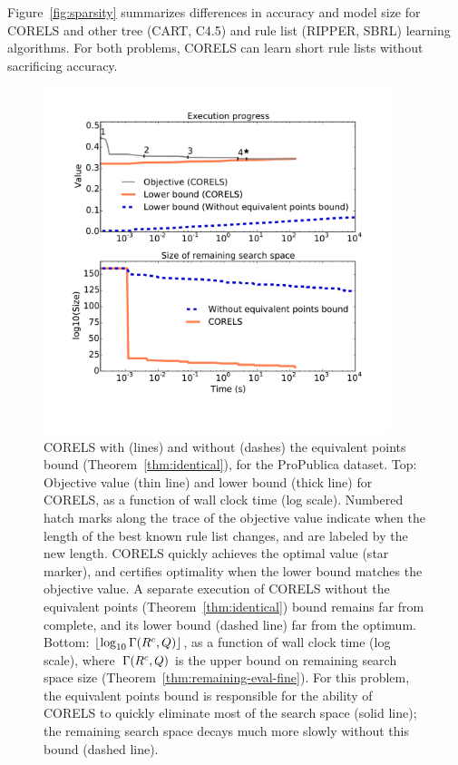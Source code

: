 Figure~\ref{fig:sparsity} summarizes differences in accuracy and model size
for CORELS and other tree (CART, C4.5) and rule list (RIPPER, SBRL) learning algorithms.
%
For both problems, CORELS can learn short rule lists without sacrificing accuracy.

\begin{figure}[t!]
\begin{center}
\includegraphics[trim={20mm, 25mm, 24mm, 20mm},
width=0.9\textwidth]{figs/compas_execution_large-remaining-space.pdf}
\end{center}
\caption{CORELS with (lines) and without
(dashes) the equivalent points bound (Theorem~\ref{thm:identical}),
for the ProPublica dataset.
%
Top: Objective value (thin line) and lower bound (thick line) for CORELS,
as a function of wall clock time (log scale).
%
Numbered hatch marks along the trace of the objective value
indicate when the length of the best known rule list changes,
and are labeled by the new length.
%
CORELS quickly achieves the optimal value (star marker),
and certifies optimality when the lower bound matches the objective value.
%
A separate execution of CORELS without the equivalent points (Theorem~\ref{thm:identical})
bound remains far from complete, and its lower bound (dashed line) far from the optimum.
%
Bottom: $\lfloor \log_{10} \Gamma({R^c}, Q) \rfloor$,
as a function of wall clock time (log scale),
where~$\Gamma({R^c}, Q)$
is the upper bound on remaining search space size
(Theorem~\ref{thm:remaining-eval-fine}).
%
For this problem, the equivalent points bound is responsible for the ability of
CORELS to quickly eliminate most of the search space (solid line);
the remaining search space decays much more slowly without this bound (dashed line).
}
\label{fig:objective}
\end{figure}

